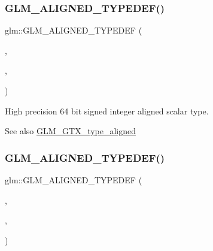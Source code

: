 \subsubsection{\texorpdfstring{G\+L\+M\+\_\+\+A\+L\+I\+G\+N\+E\+D\+\_\+\+T\+Y\+P\+E\+D\+E\+F()}{GLM\_ALIGNED\_TYPEDEF()}\hspace{0.1cm}{\footnotesize\ttfamily [28/209]}}
{\footnotesize\ttfamily glm\+::\+G\+L\+M\+\_\+\+A\+L\+I\+G\+N\+E\+D\+\_\+\+T\+Y\+P\+E\+D\+EF (\begin{DoxyParamCaption}\item[{\hyperlink{group__gtc__type__precision_ga7ffb27943e9569800979081bc548621c}{highp\+\_\+int64}}]{,  }\item[{aligned\+\_\+highp\+\_\+int64}]{,  }\item[{8}]{ }\end{DoxyParamCaption})}

High precision 64 bit signed integer aligned scalar type. \begin{DoxySeeAlso}{See also}
\hyperlink{group__gtx__type__aligned}{G\+L\+M\+\_\+\+G\+T\+X\+\_\+type\+\_\+aligned} 
\end{DoxySeeAlso}
\mbox{\label{group__gtx__type__aligned_gab3e10c77a20d1abad2de1c561c7a5c18}} 
\subsubsection{\texorpdfstring{G\+L\+M\+\_\+\+A\+L\+I\+G\+N\+E\+D\+\_\+\+T\+Y\+P\+E\+D\+E\+F()}{GLM\_ALIGNED\_TYPEDEF()}\hspace{0.1cm}{\footnotesize\ttfamily [29/209]}}
{\footnotesize\ttfamily glm\+::\+G\+L\+M\+\_\+\+A\+L\+I\+G\+N\+E\+D\+\_\+\+T\+Y\+P\+E\+D\+EF (\begin{DoxyParamCaption}\item[{\hyperlink{group__gtc__type__precision_ga417701b99e6e7992f35ab2ef694f88b2}{highp\+\_\+int8\+\_\+t}}]{,  }\item[{aligned\+\_\+highp\+\_\+int8\+\_\+t}]{,  }\item[{1}]{ }\end{DoxyParamCaption})}

